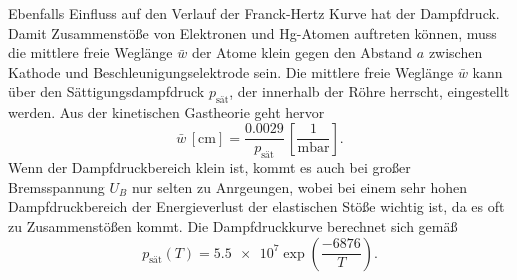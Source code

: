 Ebenfalls Einfluss auf den Verlauf der Franck-Hertz Kurve hat der Dampfdruck. Damit Zusammenstöße von Elektronen und Hg-Atomen 
auftreten können, muss die mittlere freie Weglänge $\bar{w}$ der Atome klein gegen den Abstand $a$ zwischen Kathode und Beschleunigungselektrode
sein. Die mittlere freie Weglänge $\bar{w}$ kann über den Sättigungsdampfdruck $p_{\text{sät}}$, der innerhalb der Röhre herrscht,
eingestellt werden. Aus der kinetischen Gastheorie geht hervor
\begin{equation}
    \bar{w} \, \left[\unit{\centi\meter}\right] = \frac{0.0029}{p_{\text{sät}}} \, \left[ \frac{1}{\unit{\milli\bar}}\right].
    \label{eqn:dampf1}
\end{equation}
Wenn der Dampfdruckbereich klein ist, kommt es auch bei großer Bremsspannung $U_B$ nur selten zu Anrgeungen, wobei bei einem 
sehr hohen Dampfdruckbereich der Energieverlust der elastischen Stöße wichtig ist, da es oft zu Zusammenstößen kommt.
Die Dampfdruckkurve berechnet sich gemäß
\begin{equation}
    p_{\text{sät}} (T) = \num{5.5e7} \exp{\left( \frac{-6876}{T} \right)} .
    \label{eqn:dampf2}
\end{equation}
\vspace{-6ex}
